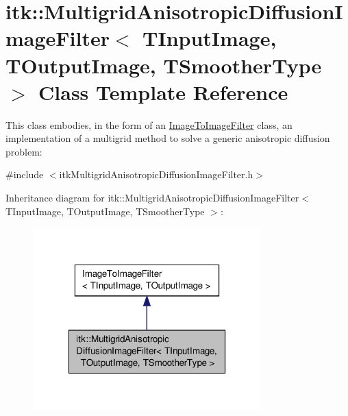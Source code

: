 \hypertarget{classitk_1_1_multigrid_anisotropic_diffusion_image_filter}{\section{itk\-:\-:Multigrid\-Anisotropic\-Diffusion\-Image\-Filter$<$ T\-Input\-Image, T\-Output\-Image, T\-Smoother\-Type $>$ Class Template Reference}
\label{classitk_1_1_multigrid_anisotropic_diffusion_image_filter}
}


This class embodies, in the form of an \hyperlink{class_image_to_image_filter}{Image\-To\-Image\-Filter} class, an implementation of a multigrid method to solve a generic anisotropic diffusion problem\-:  




{\ttfamily \#include $<$itk\-Multigrid\-Anisotropic\-Diffusion\-Image\-Filter.\-h$>$}



Inheritance diagram for itk\-:\-:Multigrid\-Anisotropic\-Diffusion\-Image\-Filter$<$ T\-Input\-Image, T\-Output\-Image, T\-Smoother\-Type $>$\-:
\nopagebreak
\begin{figure}[H]
\begin{center}
\leavevmode
\includegraphics[width=250pt]{classitk_1_1_multigrid_anisotropic_diffusion_image_filter__inherit__graph}
\end{center}
\end{figure}



